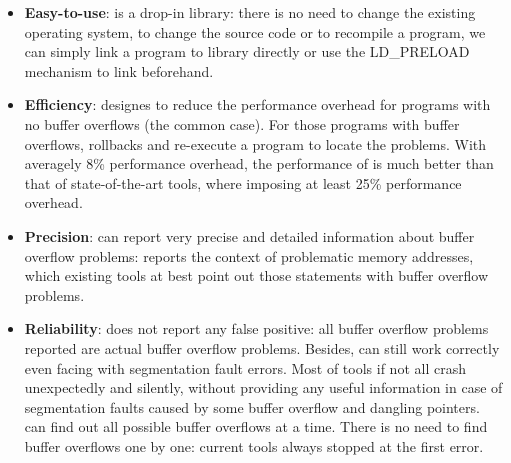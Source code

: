 \begin{itemize}
\item \textbf{Easy-to-use}:
\doubletake{} is a drop-in library: there is no need to change the
existing operating system, to change the source code or to recompile a program,
we can simply link a program to \doubletake{} library directly or 
use the LD\_PRELOAD mechanism to link \doubletake{} beforehand.

\item \textbf{Efficiency}:
\doubletake{} designes to reduce the performance overhead for 
programs with no buffer overflows (the common case). For those programs with buffer overflows, 
\doubletake{} rollbacks and re-execute a program to locate the problems. 
With averagely 8\% performance overhead, the performance of \doubletake{} is much better than 
that of state-of-the-art tools, where imposing at least 25\% performance overhead.

\begin{comment}
Existing tools normally stop the program when an overflow is detected so that they can report 
where a problem occurs. But to detect a overflow immediately,
they instrument every memory access and introduce significant 
performance overhead (by more than 23\%). 
Completely different with these tools, \doubletake{} designes to reduce the performance overhead for 
programs with no buffer overflows (the common case) and re-executes a program deterministically
after installing watch point for those programs with buffer overflows. 
With averagely 2\% performance overhead, the performance of \doubletake{} is even better than   
that of Cruiser~\cite{overflow:Cruiser} (5\% slowdown): Cruiser utilizes an additional CPU 
to run an overflow checking thread simulataneously but can not report the locations of problems.
\end{comment} 

\item \textbf{Precision}:
\doubletake{} can report very precise and detailed information about buffer overflow problems:  
\doubletake{} reports the context of problematic memory addresses, 
which existing tools at best point out those statements with buffer overflow problems.

\item \textbf{Reliability}:
\doubletake{} does not report any false positive: all buffer overflow problems reported 
are actual buffer overflow problems. 
Besides, \doubletake{} can still work correctly even facing with segmentation fault errors.
Most of tools if not all crash unexpectedly and silently, 
without providing any useful information in case of segmentation faults 
caused by some buffer overflow and dangling pointers.
\doubletake{} can find out all possible buffer overflows at a time. 
There is no need to find buffer overflows one by one: current tools
always stopped at the first error.


\end{itemize}
